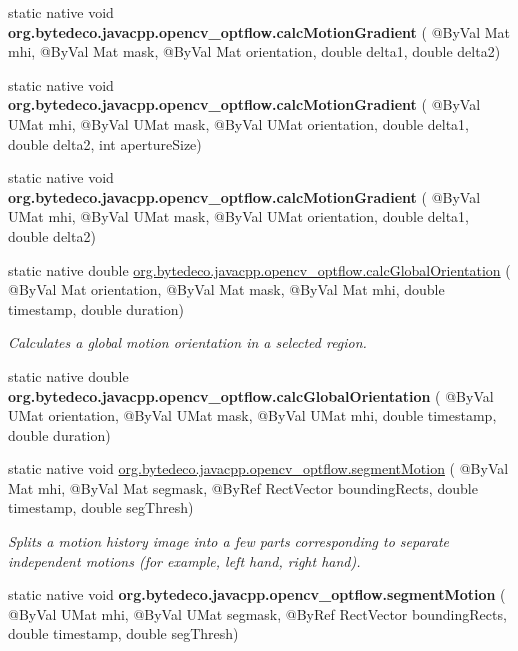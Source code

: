 \begin{DoxyCompactItemize}
static native void {\bfseries org.\+bytedeco.\+javacpp.\+opencv\+\_\+optflow.\+calc\+Motion\+Gradient} ( @By\+Val Mat mhi, @By\+Val Mat mask, @By\+Val Mat orientation, double delta1, double delta2)
\item 
\mbox{\label{group__optflow_ga6ac164310092a6d2ecec7356e0bdd88d}} 
static native void {\bfseries org.\+bytedeco.\+javacpp.\+opencv\+\_\+optflow.\+calc\+Motion\+Gradient} ( @By\+Val U\+Mat mhi, @By\+Val U\+Mat mask, @By\+Val U\+Mat orientation, double delta1, double delta2, int aperture\+Size)
\item 
\mbox{\label{group__optflow_ga55f1d6817b88e79e4f9f46014b361ea0}} 
static native void {\bfseries org.\+bytedeco.\+javacpp.\+opencv\+\_\+optflow.\+calc\+Motion\+Gradient} ( @By\+Val U\+Mat mhi, @By\+Val U\+Mat mask, @By\+Val U\+Mat orientation, double delta1, double delta2)
\item 
static native double \hyperlink{group__optflow_gae09be23e6ebae54e6dad95914a82282d}{org.\+bytedeco.\+javacpp.\+opencv\+\_\+optflow.\+calc\+Global\+Orientation} ( @By\+Val Mat orientation, @By\+Val Mat mask, @By\+Val Mat mhi, double timestamp, double duration)
\begin{DoxyCompactList}\small\item\em Calculates a global motion orientation in a selected region. \end{DoxyCompactList}\item 
\mbox{\label{group__optflow_ga2b0fa162d7e97fc6d8d5c743eb9f7e76}} 
static native double {\bfseries org.\+bytedeco.\+javacpp.\+opencv\+\_\+optflow.\+calc\+Global\+Orientation} ( @By\+Val U\+Mat orientation, @By\+Val U\+Mat mask, @By\+Val U\+Mat mhi, double timestamp, double duration)
\item 
static native void \hyperlink{group__optflow_gad1ff5ca68f3f39b0547c8d249b99185b}{org.\+bytedeco.\+javacpp.\+opencv\+\_\+optflow.\+segment\+Motion} ( @By\+Val Mat mhi, @By\+Val Mat segmask, @By\+Ref Rect\+Vector bounding\+Rects, double timestamp, double seg\+Thresh)
\begin{DoxyCompactList}\small\item\em Splits a motion history image into a few parts corresponding to separate independent motions (for example, left hand, right hand). \end{DoxyCompactList}\item 
\mbox{\label{group__optflow_gaf6c40ad0d4b0f8ce55f6b081001cae94}} 
static native void {\bfseries org.\+bytedeco.\+javacpp.\+opencv\+\_\+optflow.\+segment\+Motion} ( @By\+Val U\+Mat mhi, @By\+Val U\+Mat segmask, @By\+Ref Rect\+Vector bounding\+Rects, double timestamp, double seg\+Thresh)
\end{DoxyCompactItemize}


